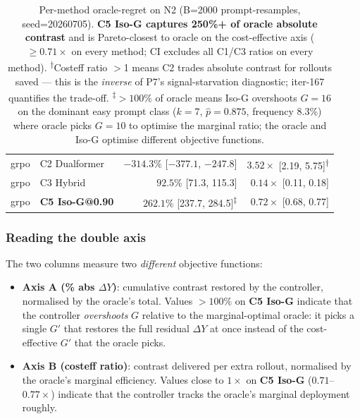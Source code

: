 \documentclass{article}
\begin{document}
\begin{table}[ht]
\begin{tabular}{llrr}
grpo   & C2 Dualformer      & $-314.3\%$ [$-377.1$, $-247.8$] & $3.52\times$ [2.19, 5.75]\textsuperscript{$\dagger$} \\
grpo   & C3 Hybrid          & $92.5\%$ [71.3, 115.3] & $0.14\times$ [0.11, 0.18] \\
grpo   & \textbf{C5 Iso-G@0.90} & $\mathbf{262.1\%}$ [237.7, 284.5]\textsuperscript{$\ddagger$} & $\mathbf{0.72\times}$ [0.68, 0.77] \\
\bottomrule
\end{tabular}
\caption{Per-method oracle-regret on N2 (B=2000 prompt-resamples, seed=20260705).
\textbf{C5 Iso-G captures 250\%+ of oracle absolute contrast} and is Pareto-closest
to oracle on the cost-effective axis ($\geq 0.71\times$ on every method;
CI excludes all C1/C3 ratios on every method).
\textsuperscript{$\dagger$}Costeff ratio $>$1 means C2 trades absolute contrast
for rollouts saved --- this is the \emph{inverse} of P7's signal-starvation
diagnostic; iter-167 quantifies the trade-off.
\textsuperscript{$\ddagger$}$> 100\%$ of oracle means Iso-G overshoots $G=16$
on the dominant easy prompt class ($k{=}7$, $\hat p = 0.875$, frequency
8.3\%) where oracle picks $G{=}10$ to optimise the marginal ratio; the
oracle and Iso-G optimise different objective functions.}
\label{tab:p7-iter167-axis}
\end{table}

\subsubsection*{Reading the double axis}

The two columns measure two \emph{different} objective functions:

\begin{itemize}
\item \textbf{Axis A (\% abs $\Delta Y$)}: cumulative contrast restored by the
      controller, normalised by the oracle's total. Values $> 100\%$ on
      \textbf{C5 Iso-G} indicate that the controller \emph{overshoots} $G$
      relative to the marginal-optimal oracle: it picks a single $G'$ that
      restores the full residual $\Delta Y$ at once instead of the
      cost-effective $G'$ that the oracle picks.
\item \textbf{Axis B (costeff ratio)}: contrast delivered per extra rollout,
      normalised by the oracle's marginal efficiency. Values close to $1\times$
      on \textbf{C5 Iso-G} ($0.71$--$0.77\times$) indicate that the controller
      tracks the oracle's marginal deployment roughly.
\end{itemize}
\end{document}
